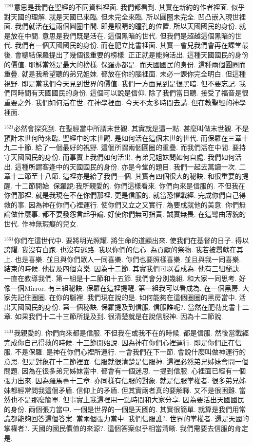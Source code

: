 \documentclass{book}
\begin{document}
$^{1281}$意思是我們在聖經的不同資料裡面.
我們都看到.
其實在新約的作者裡面.
似乎對天國的理解.
就是天國已來臨.
但未完全來臨.
所以圓圈未完全.
凹凸嵌入現世裡面.
我們就活在這兩個圓圈中間.
即是眼睛的瞳孔的位置.
所以天國國民的身份.
就是放在中間.
意思是我們既是活在.
這個黑暗的世代.
但我們是超越這個黑暗的世代.
我們有一個天國國民的身份.
而在肥立比書裡面.
其實一會兒我們會再在課堂最後.
會總結保羅提出了幾個很重要的榜樣.
正正就是能夠活出.
這種天國國民的身份的價值.
耶穌當然是最大的榜樣.
保羅亦都是.
而天國國民的身份.
這種兩個圓圈而重疊.
就是我希望聽的弟兄姐妹.
都放在你的腦裡面.
未必一課你完全明白.
但這種視野.
即是當我們今天見到世界的價值.
我們一方面見到是很黑暗.
但不要忘記.
我們同時間有天國國民的身份.
這個可以說是信仰.
除了我們當日聽.
接受了福音是很重要之外.
我們如何活在世.
在神學裡面.
今天不太多時間去講.
但在教聖經的神學裡面.

$^{1321}$必然會探究到.
在聖經當中所謂末世觀.
其實就是這一點.
甚麼叫做末世觀.
不是預計末世何時來臨.
聖經中的末世觀.
是如何活在這個末世的世代.
而保羅在三章十九二十節.
給了一個最好的視野.
這個所謂兩個圓圈的重疊.
而我們活在中間.
要持守天國國民的身份.
而事實上我們如何活出.
有弟兄姐妹問如何自處.
我們如何活出.
這種所謂客逢中的天國國民的身份.
亦是今堂的題目.
我們一起去萬讀一次.
二章十二節至十八節.
這裡亦是給了我們一個.
其實有四個很大的秘訣.
和很重要的提醒.
十二節開始.
保羅說:我所親愛的.
你們這樣看來.
你們向來是信服的.
不但我在你們那裡.
就是我現在不在你們那裡.
更是信服的.
就當恐懼戰經.
完成你們自己得救的事.
因為神在你們心裡運行.
使你們又立之又實行.
為要成就他的美意.
你們無論做什麼事.
都不要發怨言起爭論.
好使你們無可指責.
誠實無畏.
在這彎曲薄貌的世代.
作神無瑕癡的兒女.

$^{1361}$你們在這世代中.
要將明光照耀.
將生命的道顯出來.
使我們在基督的日子.
得以誇耀.
我沒有白跑.
也沒有逃路.
我以你們的信心.
為貢獻的祭物.
我若被囂獻在其上.
也是喜樂.
並且與你們眾人一同喜樂.
你們也要照樣喜樂.
並且與我一同喜樂.
結束的時候.
他提及四個喜樂.
因為十二節.
其實我們可以看成為.
他有三組秘訣.
一直在教導我們.
第一組是十二節和十五節.
我們會分別幾組.
和大家一同思考.
好像一個Mirror.
有三組秘訣.
保羅在這裡提醒.
第一組我可以看成為.
在一個黑房.
大家先記住圈圈.
在你的腦裡.
我們現在說的是.
如何能夠在這個圈圈的黑房當中.
活出天國國民的身份.
第一個秘訣.
保羅提及到信服.
信服誰呢?.
當然在肥勒比書十二章.
如果我們十二十三節所提及到.
很清楚就是在說信服神.
因為十二節說.

$^{1401}$我親愛的.
你們向來都是信服.
不但我在或我不在的時候.
都是信服.
然後當戰經完成你自己得救的時候.
十三節開始說.
因為神在你們心裡運行.
即是你們正在信服.
不是保羅.
是神在你們心裡所運行.
一會我們在下一節.
會說什麼叫做神運行的意思.
但是對象在十二節裡面.
信服就很清楚是信服神.
這裡必然弟兄姊妹會問一個問題.
因為在很多弟兄姊妹當中.
都會有一個迷思.
一提到信服.
心裡面已經有一個張力出來.
因為羅馬書十三章.
亦同樣有信服的對象.
就是信服掌權者.
很多弟兄姊妹都經常問我這個矛盾.
信仰上的矛盾.
但其實兩者真的要解釋.
又不是很困難.
當然也不是那麼簡單.
但事實上我這裡用一點時間和大家分享.
因為要活出天國國民的身份.
兩個張力當中.
一個是世界的一個是天國的.
其實很簡單.
就算是我們用常識都能夠回答這個答案.
當兩個張力當中.
我們信服誰?.
世界的掌權者.
還是天國的掌權者?.
天國的國民價值的來源?.
這個答案似乎相當清晰.
我們需要去信服的肯定是.
\end{document}
